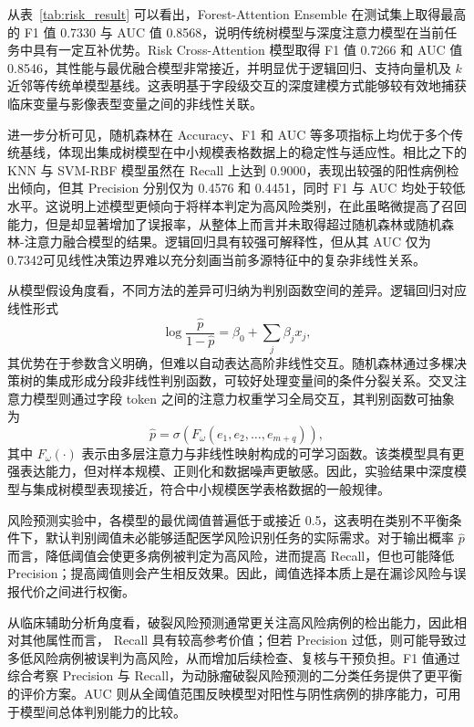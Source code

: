 从表~\ref{tab:risk_result} 可以看出，Forest-Attention Ensemble 在测试集上取得最高的 F1 值 0.7330 与 AUC 值 0.8568，说明传统树模型与深度注意力模型在当前任务中具有一定互补优势。Risk Cross-Attention 模型取得 F1 值 0.7266 和 AUC 值 0.8546，其性能与最优融合模型非常接近，并明显优于逻辑回归、支持向量机及 $k$ 近邻等传统单模型基线。这表明基于字段级交互的深度建模方式能够较有效地捕获临床变量与影像表型变量之间的非线性关联。

进一步分析可见，随机森林在 Accuracy、F1 和 AUC 等多项指标上均优于多个传统基线，体现出集成树模型在中小规模表格数据上的稳定性与适应性。相比之下的KNN 与 SVM-RBF 模型虽然在 Recall 上达到 0.9000，表现出较强的阳性病例检出倾向，但其 Precision 分别仅为 0.4576 和 0.4451，同时 F1 与 AUC 均处于较低水平。这说明上述模型更倾向于将样本判定为高风险类别，在此虽略微提高了召回能力，但是却显著增加了误报率，从整体上而言并未取得超过随机森林或随机森林-注意力融合模型的结果。逻辑回归具有较强可解释性，但从其 AUC 仅为 0.7342可见线性决策边界难以充分刻画当前多源特征中的复杂非线性关系。

从模型假设角度看，不同方法的差异可归纳为判别函数空间的差异。逻辑回归对应线性形式
\begin{equation}
\log\frac{\hat{p}}{1-\hat{p}}=\beta_0+\sum_{j}\beta_jx_j,
\end{equation}
其优势在于参数含义明确，但难以自动表达高阶非线性交互。随机森林通过多棵决策树的集成形成分段非线性判别函数，可较好处理变量间的条件分裂关系。交叉注意力模型则通过字段 token 之间的注意力权重学习全局交互，其判别函数可抽象为
\begin{equation}
\hat{p}=\sigma\left(F_{\omega}(e_1,e_2,\ldots,e_{m+q})\right),
\end{equation}
其中 $F_{\omega}(\cdot)$ 表示由多层注意力与非线性映射构成的可学习函数。该类模型具有更强表达能力，但对样本规模、正则化和数据噪声更敏感。因此，实验结果中深度模型与集成树模型表现接近，符合中小规模医学表格数据的一般规律。


风险预测实验中，各模型的最优阈值普遍低于或接近 0.5，这表明在类别不平衡条件下，默认判别阈值未必能够适配医学风险识别任务的实际需求。对于输出概率 $\hat{p}$ 而言，降低阈值会使更多病例被判定为高风险，进而提高 Recall，但也可能降低 Precision；提高阈值则会产生相反效果。因此，阈值选择本质上是在漏诊风险与误报代价之间进行权衡。

从临床辅助分析角度看，破裂风险预测通常更关注高风险病例的检出能力，因此相对其他属性而言， Recall 具有较高参考价值；但若 Precision 过低，则可能导致过多低风险病例被误判为高风险，从而增加后续检查、复核与干预负担。F1 值通过综合考察 Precision 与 Recall，为动脉瘤破裂风险预测的二分类任务提供了更平衡的评价方案。AUC 则从全阈值范围反映模型对阳性与阴性病例的排序能力，可用于模型间总体判别能力的比较。

